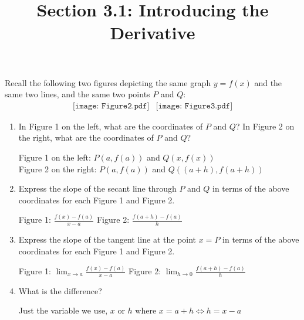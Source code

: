 \documentclass[nooutcomes]{ximera}
\title{Section 3.1: Introducing the Derivative}
\begin{document}
\begin{abstract}		\end{abstract}
\maketitle

\begin{problem}
 Recall the following two figures depicting the same graph $y=f(x)$ and the same two lines, and the same two points $P$ and $Q$:
  \[
    \begin{array}{lr}
      \texttt{[image: Figure2.pdf]} &		   \texttt{[image: Figure3.pdf]}
    \end{array}
  \]
  \begin{enumerate}
    \item
      In Figure 1 on the left, what are the coordinates of $P$ and $Q$?  In Figure 2 on the right, what are the coordinates of $P$ and $Q$?

	\begin{freeResponse}
	Figure 1 on the left: $P(a,f(a))$ and $Q(x,f(x))$ \\
	Figure 2 on the right: $P(a,f(a))$ and $Q((a+h),f(a+h))$

	\end{freeResponse}

	\item Express the slope of the secant line through $P$ and $Q$ in terms of the above coordinates for each Figure 1 and Figure 2.

      \begin{freeResponse}
	Figure 1: $\frac{f(x)-f(a)}{x-a}$ 
	Figure 2: $\frac{f(a+h)-f(a)}{h}$
        \end{freeResponse}
	
	\item
	Express the slope of the tangent line at the point $x=P$ in terms of the above coordinates for each Figure 1 and Figure 2.

	\begin{freeResponse}
        	Figure 1:  $ \lim_{x \to a} \frac{f(x)-f(a)}{x-a}$
	Figure 2: $\lim_{h \to 0} \frac{f(a+h)-f(a)}{h}$
      \end{freeResponse}

    \item 
      What is the difference?
      \begin{freeResponse}
	Just the variable we use, $x$ or $h$ where $x=a+h \iff h=x-a$
      \end{freeResponse}



\end{enumerate}
\end{problem}
\end{document}
